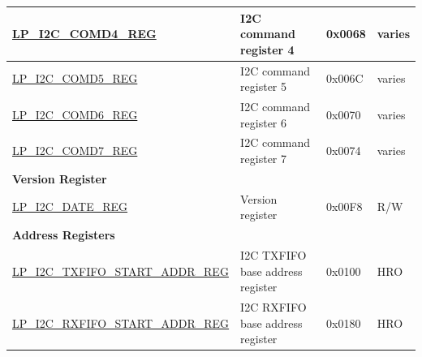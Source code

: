 \begin{longtable}{ | p{6cm} | p{7.2cm} | p{1.3cm} | p{1cm} | }
    \hyperref[regdesc:LPI2CCOMD4REG]{LP\_I2C\_COMD4\_REG} & I2C command register 4 & 0x0068 & varies \\ \hline
    \hyperref[regdesc:LPI2CCOMD5REG]{LP\_I2C\_COMD5\_REG} & I2C command register 5 & 0x006C & varies \\ \hline
    \hyperref[regdesc:LPI2CCOMD6REG]{LP\_I2C\_COMD6\_REG} & I2C command register 6 & 0x0070 & varies \\ \hline
    \hyperref[regdesc:LPI2CCOMD7REG]{LP\_I2C\_COMD7\_REG} & I2C command register 7 & 0x0074 & varies \\ \hline
    \multicolumn{4}{|l|}{\textbf{Version Register}} \\ \hline
    \hyperref[regdesc:LPI2CDATEREG]{LP\_I2C\_DATE\_REG} & Version register & 0x00F8 & R/W \\ \hline
    \multicolumn{4}{|l|}{\textbf{Address Registers}} \\ \hline
    \hyperref[regdesc:LPI2CTXFIFOSTARTADDRREG]{LP\_I2C\_TXFIFO\_START\_ADDR\_REG} & I2C TXFIFO base address register & 0x0100 & HRO \\ \hline
    \hyperref[regdesc:LPI2CRXFIFOSTARTADDRREG]{LP\_I2C\_RXFIFO\_START\_ADDR\_REG} & I2C RXFIFO base address register & 0x0180 & HRO \\ \hline
    \end{longtable}

